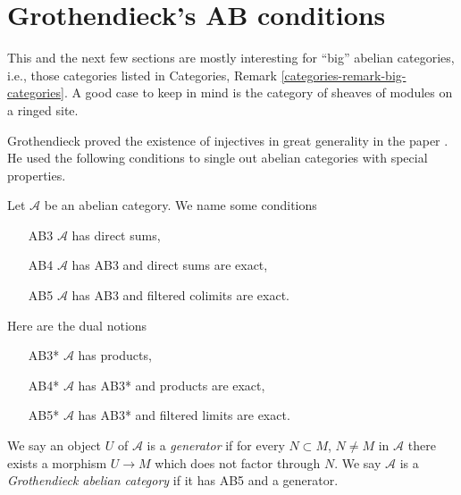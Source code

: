 \section{Grothendieck's AB conditions}
\label{section-grothendieck-conditions}

\noindent
This and the next few sections are mostly interesting for ``big'' abelian
categories, i.e., those categories listed in
Categories, Remark \ref{categories-remark-big-categories}.
A good case to keep in mind is the category of sheaves of modules
on a ringed site.

\medskip\noindent
Grothendieck proved the existence of injectives in great generality
in the paper \cite{Tohoku}. He used the following conditions to single
out abelian categories with special properties.

\begin{definition}
\label{definition-grothendieck-conditions}
Let $\mathcal{A}$ be an abelian category. We name some conditions
\begin{enumerate}
\item[AB3] $\mathcal{A}$ has direct sums,
\item[AB4] $\mathcal{A}$ has AB3 and direct sums are exact,
\item[AB5] $\mathcal{A}$ has AB3 and filtered colimits are exact.
\end{enumerate}
Here are the dual notions
\begin{enumerate}
\item[AB3*] $\mathcal{A}$ has products,
\item[AB4*] $\mathcal{A}$ has AB3* and products are exact,
\item[AB5*] $\mathcal{A}$ has AB3* and filtered limits are exact.
\end{enumerate}
We say an object $U$ of $\mathcal{A}$ is a {\it generator} if
for every $N \subset M$, $N \not = M$ in $\mathcal{A}$ there exists a morphism
$U \to M$ which does not factor through $N$.
We say $\mathcal{A}$ is a {\it Grothendieck abelian category} if
it has AB5 and a generator.
\end{definition}

